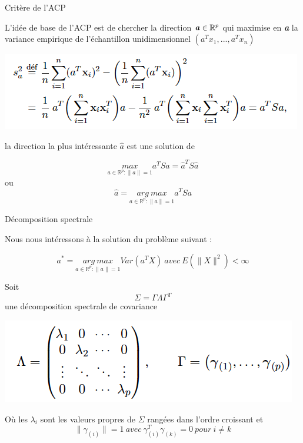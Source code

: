 \documentclass[11pt]{beamer}
\begin{document}
\begin{frame}{ Critère de l'ACP}

L’idée de base de l’ACP est de chercher la direction  $\textbf{\textit{a}} \in \mathbb{R}^p$ qui maximise en \textit{\textbf{a}} la variance empirique de l’échantillon unidimensionnel $(a^T x_1, . . . ,a^T x_n)$


\centering
\includegraphics[scale=0.6]{Sa.png} 

la direction la plus intéressante $\hat{a}$ est une solution de 

$$\underset{a \in \mathbb{R}^p : \parallel a \parallel=1}{max}    a^TSa=\hat{a}^TS\hat{a} $$
ou 
$$ \hat{a}=\underset{a \in \mathbb{R}^p : \parallel a \parallel=1}{arg \ max} a^T Sa $$

\end{frame}


\begin{frame}{Décomposition spectrale}

Nous nous intéressons à la solution du problème suivant : 

$$ a^*=\underset{a \in \mathbb{R}^p : \parallel a \parallel=1}{arg \ max} Var (a^TX) \ avec \  E(\parallel X \parallel^2)<\infty$$

Soit $$ \Sigma =\Gamma \Lambda \Gamma^T $$ une décomposition spectrale de covariance 
 
\centering
\includegraphics[scale=.4]{Decomp.png} 

Où les $\lambda_i$ sont les valeurs propres de $\Sigma$ rangées dans l'ordre croissant et  $$ \parallel \gamma_{(i)}  \parallel=1    \  avec \   \gamma_{(i)}^T \gamma_{(k)}=0 \  pour \  i \neq k $$ 

\end{frame}
\end{document}
